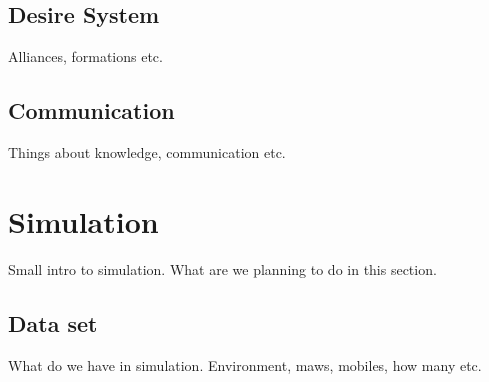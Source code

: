 \documentclass[conference]{IEEEtran}
\begin{document}


\subsection{Desire System}
Alliances, formations etc.









\subsection{Communication}
Things about knowledge, communication etc.







\section{Simulation}
Small intro to simulation. What are we planning to do in this section.









\subsection{Data set}
What do we have in simulation. Environment, maws, mobiles, how many etc.
\end{document}
